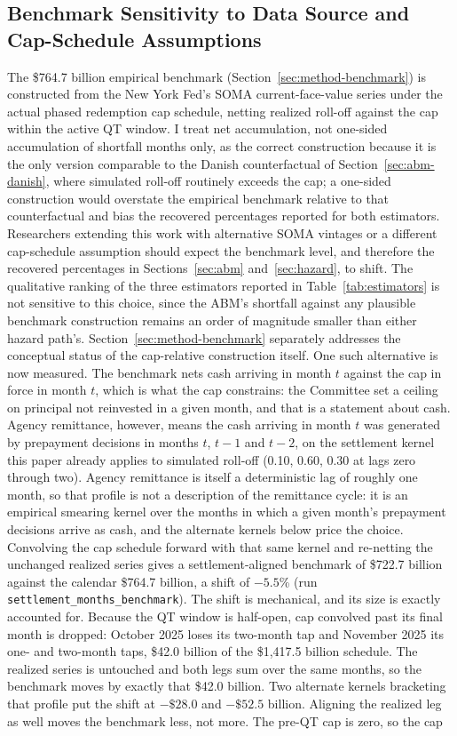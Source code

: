 \documentclass[12pt]{article}
\begin{document}
\subsection{Benchmark Sensitivity to Data Source and Cap-Schedule Assumptions}\label{sec:robustness-benchmark}

The \$764.7 billion empirical benchmark (Section~\ref{sec:method-benchmark}) is constructed from the New York Fed's SOMA current-face-value series under the actual phased redemption cap schedule, netting realized roll-off against the cap within the active QT window. I treat net accumulation, not one-sided accumulation of shortfall months only, as the correct construction because it is the only version comparable to the Danish counterfactual of Section~\ref{sec:abm-danish}, where simulated roll-off routinely exceeds the cap; a one-sided construction would overstate the empirical benchmark relative to that counterfactual and bias the recovered percentages reported for both estimators. Researchers extending this work with alternative SOMA vintages or a different cap-schedule assumption should expect the benchmark level, and therefore the recovered percentages in Sections~\ref{sec:abm} and~\ref{sec:hazard}, to shift. The qualitative ranking of the three estimators reported in Table~\ref{tab:estimators} is not sensitive to this choice, since the ABM's shortfall against any plausible benchmark construction remains an order of magnitude smaller than either hazard path's. Section~\ref{sec:method-benchmark} separately addresses the conceptual status of the cap-relative construction itself. One such alternative is now measured. The benchmark nets cash arriving in month $t$ against the cap in force in month $t$, which is what the cap constrains: the Committee set a ceiling on principal not reinvested in a given month, and that is a statement about cash. Agency remittance, however, means the cash arriving in month $t$ was generated by prepayment decisions in months $t$, $t-1$ and $t-2$, on the settlement kernel this paper already applies to simulated roll-off (0.10, 0.60, 0.30 at lags zero through two). Agency remittance is itself a deterministic lag of roughly one month, so that profile is not a description of the remittance cycle: it is an empirical smearing kernel over the months in which a given month's prepayment decisions arrive as cash, and the alternate kernels below price the choice. Convolving the cap schedule forward with that same kernel and re-netting the unchanged realized series gives a settlement-aligned benchmark of \$722.7 billion against the calendar \$764.7 billion, a shift of $-5.5$\% (run \texttt{settlement\_months\_benchmark}). The shift is mechanical, and its size is exactly accounted for. Because the QT window is half-open, cap convolved past its final month is dropped: October 2025 loses its two-month tap and November 2025 its one- and two-month taps, \$42.0 billion of the \$1{,}417.5 billion schedule. The realized series is untouched and both legs sum over the same months, so the benchmark moves by exactly that \$42.0 billion. Two alternate kernels bracketing that profile put the shift at $-\$28.0$ and $-\$52.5$ billion. Aligning the realized leg as well moves the benchmark less, not more. The pre-QT cap is zero, so the cap 
\end{document}
